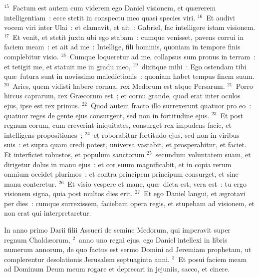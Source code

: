 ${}^{15}$~Factum est autem cum viderem ego Daniel visionem, et qu\ae rerem intelligentiam~: ecce stetit in conspectu meo quasi species viri.
${}^{16}$~Et audivi vocem viri inter Ulai~: et clamavit, et ait~: Gabriel, fac intelligere istam visionem.
${}^{17}$~Et venit, et stetit juxta ubi ego stabam~: cumque venisset, pavens corrui in faciem meam~: et ait ad me~: Intellige, fili hominis, quoniam in tempore finis complebitur visio.
${}^{18}$~Cumque loqueretur ad me, collapsus sum pronus in terram~: et tetigit me, et statuit me in gradu meo,
${}^{19}$~dixitque mihi~: Ego ostendam tibi qu\ae\ futura sunt in novissimo maledictionis~: quoniam habet tempus finem suum.
${}^{20}$~Aries, quem vidisti habere cornua, rex Medorum est atque Persarum.
${}^{21}$~Porro hircus caprarum, rex Gr\ae corum est~; et cornu grande, quod erat inter oculos ejus, ipse est rex primus.
${}^{22}$~Quod autem fracto illo surrexerunt quatuor pro eo~: quatuor reges de gente ejus consurgent, sed non in fortitudine ejus.
${}^{23}$~Et post regnum eorum, cum creverint iniquitates, consurget rex impudens facie, et intelligens propositiones~;
${}^{24}$~et roborabitur fortitudo ejus, sed non in viribus suis~: et supra quam credi potest, universa vastabit, et prosperabitur, et faciet. Et interficiet robustos, et populum sanctorum
${}^{25}$~secundum voluntatem suam, et dirigetur dolus in manu ejus~: et cor suum magnificabit, et in copia rerum omnium occidet plurimos~: et contra principem principum consurget, et sine manu conteretur.
${}^{26}$~Et visio vespere et mane, qu\ae\ dicta est, vera est~: tu ergo visionem signa, quia post multos dies erit.
${}^{27}$~Et ego Daniel langui, et \ae grotavi per dies~: cumque surrexissem, faciebam opera regis, et stupebam ad visionem, et non erat qui interpretaretur.

\bchapter
\lettrine[lines=3,image=true,loversize=0.05,lraise=-0.03]{I}{}n anno primo Darii filii Assueri de semine Medorum, qui imperavit super regnum Chald\ae orum,
${}^{2}$~anno uno regni ejus, ego Daniel intellexi in libris numerum annorum, de quo factus est sermo Domini ad Jeremiam prophetam, ut complerentur desolationis Jerusalem septuaginta anni.
${}^{3}$~Et posui faciem meam ad Dominum Deum meum rogare et deprecari in jejuniis, sacco, et cinere.


